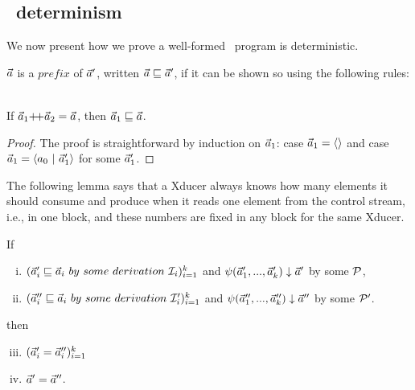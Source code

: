 \subsection{\fmsvcode \ determinism}

We now present  how we prove a well-formed \fmsvcode \  program is deterministic.\\

\begin{defi}
	$\vec a$ is a $prefix$ of $\vec a'$, written $\vec a \sqsubseteq \vec a'$, if it can be shown so using the following rules:\\
	
	\emph{}
	\\
	
\end{defi}

\begin{lem}\label{lem-app2pre}
	If $\a_1 {\++} \a_2 = \a$, then $\vec a_1 \sqsubseteq \vec a$.
\end{lem}
\begin{proof}
	The proof is straightforward by induction on $\vec a_1$: case $\vec a_1 = \langle \rangle$ and case $ \a_1 = \< a_0 \ | \ \a_1' \'>$ for some $\vec a_1'$.
\end{proof}

The following lemma says that a Xducer always knows how many elements it should consume and produce when it reads one element from the control stream, i.e., in one block, and these numbers are fixed in any block for the same Xducer.


\begin{lem} \label{lem-block-unique}
	If
	\begin{enumerate}[(i)]
		\item $(\a_i' \prefix  \a_i \ by \ some \ derivation \ \MI_{i})^k_{i=1}$ and ${\psi}(\vec a_1',...,\vec a_k') \downarrow \vec a'$ by some $\mathcal{P}$, 
		\item $(\a_i'' \prefix \a_i \ by \ some \ derivation \ \MI'_{i})^k_{i=1}$ and
		${\psi}(\vec a_1'',...,\vec a_k'') \downarrow \vec a''$ by some $\mathcal{P}'$.
	\end{enumerate} 
	then \begin{enumerate}[(i)]
		\setcounter{enumi}{2}
		\item $(\vec a_i' = \vec a_i'')^k_{i=1}$ 
		\item $\vec a' = \vec a''$.
	\end{enumerate}
\end{lem}

